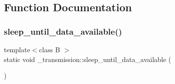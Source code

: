 \subsection{Function Documentation}
\hypertarget{namespace__transmission_a70202dcff902fb4413bc34bafaec97e0}{}\label{namespace__transmission_a70202dcff902fb4413bc34bafaec97e0} 
\subsubsection{\texorpdfstring{sleep\+\_\+until\+\_\+data\+\_\+available()}{sleep\_until\_data\_available()}}
{\footnotesize\ttfamily template$<$class B $>$ \\
static void \+\_\+transmission\+::sleep\+\_\+until\+\_\+data\+\_\+available (\begin{DoxyParamCaption}{ }\end{DoxyParamCaption})\hspace{0.3cm}{\ttfamily [static]}}

